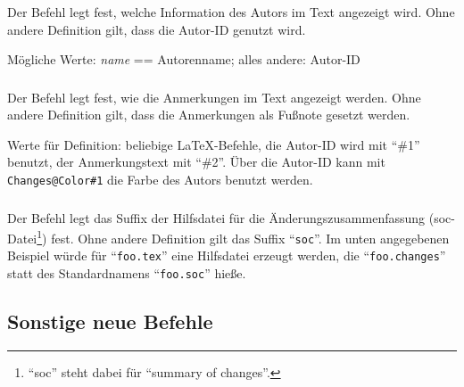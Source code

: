 \subsubsection{}
\DescribeMacro{\setauthormarkuptext}

Der Befehl  legt fest, welche Information des Autors im Text angezeigt wird.
Ohne andere Definition gilt, dass die Autor-ID genutzt wird.

Mögliche Werte: \emph{name} == Autorenname; alles andere: Autor-ID




\subsubsection{}
\DescribeMacro{\setremarkmarkup}

Der Befehl  legt fest, wie die Anmerkungen im Text angezeigt werden.
Ohne andere Definition gilt, dass die Anmerkungen als Fußnote gesetzt werden.

Werte für Definition: beliebige \LaTeX-Befehle, die Autor-ID wird mit "`\#1"' benutzt, der Anmerkungstext mit "`\#2"'.
Über die Autor-ID kann mit \texttt{Changes@Color\#1} die Farbe des Autors benutzt werden.




\subsubsection{}
\DescribeMacro{\setsocextension}

Der Befehl  legt das Suffix der Hilfsdatei für die Änderungszusammenfassung (soc-Datei\footnote{%
	"`soc"' steht dabei für "`summary of changes"'.
}) fest.
Ohne andere Definition gilt das Suffix "`\texttt{soc}"'.
Im unten angegebenen Beispiel würde für "`\texttt{foo.tex}"' eine Hilfsdatei erzeugt werden, die "`\texttt{foo.changes}"' statt des Standardnamens "`\texttt{foo.soc}"' hieße.




\subsection{Sonstige neue Befehle}
\label{sec:user:other}

